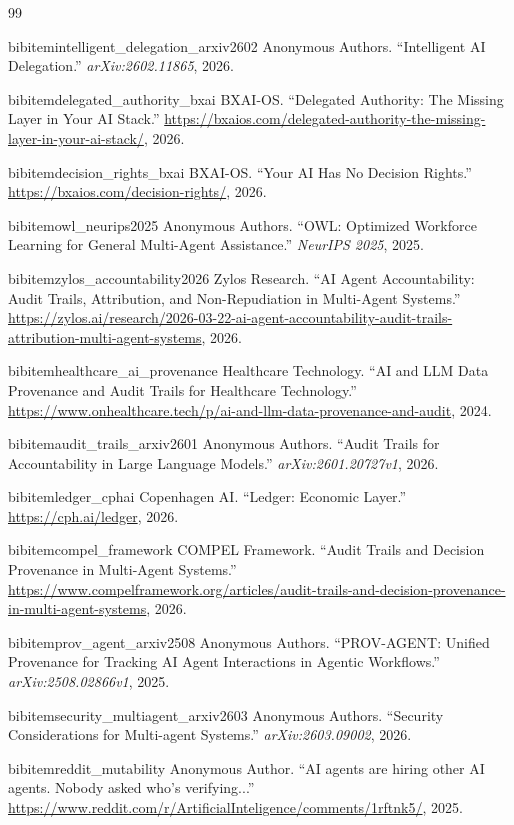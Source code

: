 \begin{thebibliography}{99}
\small

 bibitem{intelligent_delegation_arxiv2602}
 Anonymous Authors.
 ``Intelligent AI Delegation.'' 
 \emph{arXiv:2602.11865}, 2026.

 bibitem{delegated_authority_bxai}
 BXAI-OS.
 ``Delegated Authority: The Missing Layer in Your AI Stack.'' 
 \url{https://bxaios.com/delegated-authority-the-missing-layer-in-your-ai-stack/}, 2026.

 bibitem{decision_rights_bxai}
 BXAI-OS.
 ``Your AI Has No Decision Rights.'' 
 \url{https://bxaios.com/decision-rights/}, 2026.

 bibitem{owl_neurips2025}
 Anonymous Authors.
 ``OWL: Optimized Workforce Learning for General Multi-Agent Assistance.'' 
 \emph{NeurIPS 2025}, 2025.

 bibitem{zylos_accountability2026}
 Zylos Research.
 ``AI Agent Accountability: Audit Trails, Attribution, and Non-Repudiation in Multi-Agent Systems.'' 
 \url{https://zylos.ai/research/2026-03-22-ai-agent-accountability-audit-trails-attribution-multi-agent-systems}, 2026.

 bibitem{healthcare_ai_provenance}
 Healthcare Technology.
 ``AI and LLM Data Provenance and Audit Trails for Healthcare Technology.'' 
 \url{https://www.onhealthcare.tech/p/ai-and-llm-data-provenance-and-audit}, 2024.

 bibitem{audit_trails_arxiv2601}
 Anonymous Authors.
 ``Audit Trails for Accountability in Large Language Models.'' 
 \emph{arXiv:2601.20727v1}, 2026.

 bibitem{ledger_cphai}
 Copenhagen AI.
 ``Ledger: Economic Layer.'' 
 \url{https://cph.ai/ledger}, 2026.

 bibitem{compel_framework}
 COMPEL Framework.
 ``Audit Trails and Decision Provenance in Multi-Agent Systems.'' 
 \url{https://www.compelframework.org/articles/audit-trails-and-decision-provenance-in-multi-agent-systems}, 2026.

 bibitem{prov_agent_arxiv2508}
 Anonymous Authors.
 ``PROV-AGENT: Unified Provenance for Tracking AI Agent Interactions in Agentic Workflows.'' 
 \emph{arXiv:2508.02866v1}, 2025.

 bibitem{security_multiagent_arxiv2603}
 Anonymous Authors.
 ``Security Considerations for Multi-agent Systems.'' 
 \emph{arXiv:2603.09002}, 2026.

 bibitem{reddit_mutability}
 Anonymous Author.
 ``AI agents are hiring other AI agents. Nobody asked who's verifying...''
 \url{https://www.reddit.com/r/ArtificialInteligence/comments/1rftnk5/}, 2025.


\end{thebibliography}
